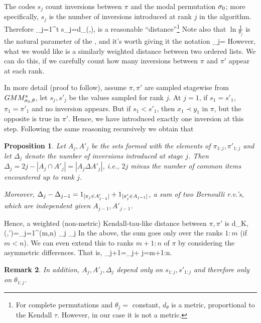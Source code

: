 \documentclass[10pt]{article}
\newtheorem{prop}{Proposition}
\newtheorem{remark}[prop]{Remark}
\begin{document}
The codes $s_j$ count inversions between $\pi$ and the modal permutation $\sigma_0$; more specifically, $s_j$ is the number of inversions introduced at rank $j$ in the \algsamgmm algorithm. Therefore
\beq
\sum_{j=1}^t s_j\ln{}=d_\theta(\pi,\sigzero),
\eeq
%
is a reasonable ``distance''\footnote{For complete permutations and $\theta_j=$ constant, $d_\theta$ is a metric, proportional to the Kendall $\tau$. However, in our case it is not a metric.} Note also that $\ln\frac{1}{\theta_j}$ is the natural parameter of the \gmms, and it's worth giving it the notation
%
\beq
\tilthe_j\;=\;\ln{}
\eeq
%
However, what we would like is a similarly weighted distance between two ordered lists. We can do this, if we carefully count how many inversions between $\pi$ and $\pi'$ appear at each rank.

In more detail (proof to follow), assume $\pi,\pi'$ are sampled
stagewise from $GMM^s_{\sigma_0,\theta}$, let $s_j,s'_j$ be the values sampled for rank $j$. At $j=1$, if $s_1=s'_1$, $\pi_1=\pi'_1$ and no inversion appears. But if $s_1<s'_1$, then $x_1\prec y_1$ in $\pi$, but the opposite is true in $\pi'$. Hence, we have introduced exactly one inversion at this step. Following the same reasoning recursively we obtain that

\begin{prop} \label{prop:delta} Let $A_j,A'_j$ be the sets formed with the elements of $\pi_{1:j},\pi'_{1:j}$ and let $\Delta_j$ denote the number of inversions introduced at stage $j$. Then $\Delta_j=2j-|A_j\cap A'_j|=|A_j\Delta A'_j|$, i.e., $2j$ minus the number of common items encountered up to rank $j$.  

Moreover, $\Delta_j-\Delta_{j-1}={1}_{[\pi_j\in
  A'_{j-1}]}+{1}_{[{\pi'_j\in A_{j-1}}]}$, a sum of two Bernoulli
r.v.'s, which are independent given $A_{j-1},A'_{j-1}$.
\end{prop}
%
Hence, a weighted (non-metric) Kendall-tau-like distance between $\pi,\pi'$ is
\beq
d_{K,\theta}(\pi,\pi')=\sum_{j=1}^{\min(m,n)} \tilthe_j \Delta_j
\eeq
%
In the above, the sum goes only over the ranks $1:m$ (if $m<n$). 
We can even extend this to ranks $m+1:n$ of $\pi$ by considering the asymmetric differences. That is,
\beq
\Delta_{j+1}\;=\;\Delta_j+
\quad {} j=m+1:n. 
\eeq
%
\begin{remark} 
In addition, $A_j,A'_j,\Delta_j$ depend only on $s_{1:j},s'_{1:j}$ and therefore only on $\theta_{1:j}$. 
\end{remark}
\end{document}

